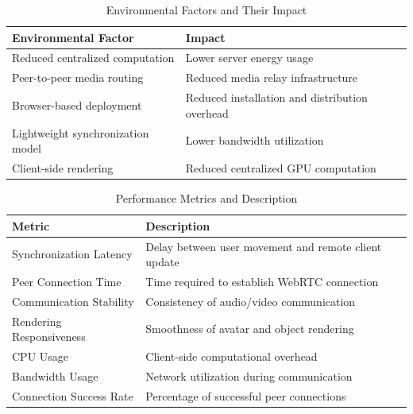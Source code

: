 \documentclass[12pt]{article}
\begin{document}
\begin{table}[h!]
\centering
\renewcommand{\arraystretch}{1.5}

\begin{tabular}{|p{6cm}|p{8cm}|}
\hline
\textbf{Environmental Factor} & \textbf{Impact} \\ 
\hline

Reduced centralized computation & Lower server energy usage \\ 
\hline

Peer-to-peer media routing & Reduced media relay infrastructure \\ 
\hline

Browser-based deployment & Reduced installation and distribution overhead \\ 
\hline

Lightweight synchronization model & Lower bandwidth utilization \\ 
\hline

Client-side rendering & Reduced centralized GPU computation \\ 
\hline

\end{tabular}
\caption{Environmental Factors and Their Impact}

\end{table}

\begin{table}[h!]
\centering
\renewcommand{\arraystretch}{1.5}

\begin{tabular}{|p{6cm}|p{8cm}|}
\hline
\textbf{Metric} & \textbf{Description} \\ 
\hline

Synchronization Latency & Delay between user movement and remote client update \\ 
\hline

Peer Connection Time & Time required to establish WebRTC connection \\ 
\hline

Communication Stability & Consistency of audio/video communication \\ 
\hline

Rendering Responsiveness & Smoothness of avatar and object rendering \\ 
\hline

CPU Usage & Client-side computational overhead \\ 
\hline

Bandwidth Usage & Network utilization during communication \\ 
\hline

Connection Success Rate & Percentage of successful peer connections \\ 
\hline

\end{tabular}
\caption{Performance Metrics and Description}

\end{table}
\end{document}

